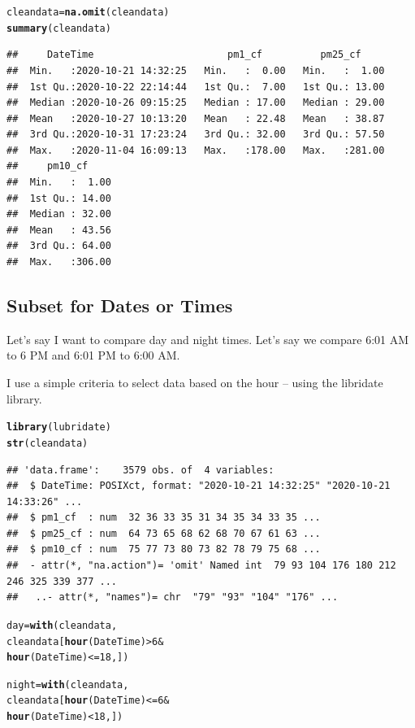 \documentclass{article}\usepackage[]{graphicx}\usepackage[]{color}
\makeatletter
\newcommand{\hlnum}[1]{\textcolor[rgb]{0.686,0.059,0.569}{#1}}%
\newcommand{\hlopt}[1]{\textcolor[rgb]{0,0,0}{#1}}%
\newcommand{\hlstd}[1]{\textcolor[rgb]{0.345,0.345,0.345}{#1}}%
\newcommand{\hlkwb}[1]{\textcolor[rgb]{0.69,0.353,0.396}{#1}}%
\newcommand{\hlkwd}[1]{\textcolor[rgb]{0.737,0.353,0.396}{\textbf{#1}}}%
\newenvironment{kframe}{%
 \def\at@end@of@kframe{}%
 \ifinner\ifhmode%
  \def\at@end@of@kframe{\end{minipage}}%
  \begin{minipage}{\columnwidth}%
 \fi\fi%
 \def\FrameCommand##1{\hskip\@totalleftmargin \hskip-\fboxsep
 \colorbox{shadecolor}{##1}\hskip-\fboxsep
     \hskip-\linewidth \hskip-\@totalleftmargin \hskip\columnwidth}%
 \MakeFramed {\advance\hsize-\width
   \@totalleftmargin\z@ \linewidth\hsize
   \@setminipage}}%
 {\par\unskip\endMakeFramed%
 \at@end@of@kframe}
\newenvironment{knitrout}{}{} %
\makeatother
\begin{document}
\begin{knitrout}
\color{fgcolor}\begin{kframe}
\begin{alltt}
\hlstd{cleandata} \hlkwb{=} \hlkwd{na.omit}\hlstd{(cleandata)}
\hlkwd{summary}\hlstd{(cleandata)}
\end{alltt}
\begin{verbatim}
##     DateTime                       pm1_cf          pm25_cf      
##  Min.   :2020-10-21 14:32:25   Min.   :  0.00   Min.   :  1.00  
##  1st Qu.:2020-10-22 22:14:44   1st Qu.:  7.00   1st Qu.: 13.00  
##  Median :2020-10-26 09:15:25   Median : 17.00   Median : 29.00  
##  Mean   :2020-10-27 10:13:20   Mean   : 22.48   Mean   : 38.87  
##  3rd Qu.:2020-10-31 17:23:24   3rd Qu.: 32.00   3rd Qu.: 57.50  
##  Max.   :2020-11-04 16:09:13   Max.   :178.00   Max.   :281.00  
##     pm10_cf      
##  Min.   :  1.00  
##  1st Qu.: 14.00  
##  Median : 32.00  
##  Mean   : 43.56  
##  3rd Qu.: 64.00  
##  Max.   :306.00
\end{verbatim}
\end{kframe}
\end{knitrout}

\subsection{Subset for Dates or Times}

Let's say I want to compare day and night times. Let's say we compare 6:01 AM to 6 PM and 6:01 PM to 6:00 AM. 

I use a simple criteria to select data based on the hour -- using the libridate library.
\begin{knitrout}
\color{fgcolor}\begin{kframe}
\begin{alltt}
\hlkwd{library}\hlstd{(lubridate)}
\hlkwd{str}\hlstd{(cleandata)}
\end{alltt}
\begin{verbatim}
## 'data.frame':	3579 obs. of  4 variables:
##  $ DateTime: POSIXct, format: "2020-10-21 14:32:25" "2020-10-21 14:33:26" ...
##  $ pm1_cf  : num  32 36 33 35 31 34 35 34 33 35 ...
##  $ pm25_cf : num  64 73 65 68 62 68 70 67 61 63 ...
##  $ pm10_cf : num  75 77 73 80 73 82 78 79 75 68 ...
##  - attr(*, "na.action")= 'omit' Named int  79 93 104 176 180 212 246 325 339 377 ...
##   ..- attr(*, "names")= chr  "79" "93" "104" "176" ...
\end{verbatim}
\begin{alltt}
\hlstd{day} \hlkwb{=} \hlkwd{with}\hlstd{(cleandata,}
     \hlstd{cleandata[}\hlkwd{hour}\hlstd{(DateTime)}\hlopt{>} \hlnum{6} \hlopt{&}
               \hlkwd{hour}\hlstd{(DateTime)}\hlopt{<=} \hlnum{18}\hlstd{,])}

\hlstd{night} \hlkwb{=} \hlkwd{with}\hlstd{(cleandata,}
     \hlstd{cleandata[}\hlkwd{hour}\hlstd{(DateTime)}\hlopt{<=} \hlnum{6} \hlopt{&}
               \hlkwd{hour}\hlstd{(DateTime)}\hlopt{<} \hlnum{18}\hlstd{,])}
\end{alltt}
\end{kframe}
\end{knitrout}
\end{document}
